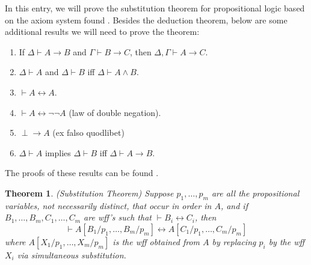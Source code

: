 \documentclass[12pt]{article}
\newtheorem{thm}{Theorem}
\begin{document}
In this entry, we will prove the substitution theorem for propositional logic based on the axiom system found .  Besides the deduction theorem, below are some additional results we will need to prove the theorem:
\begin{enumerate}
\item If $\Delta \vdash A\to B$ and $\Gamma \vdash B\to C$, then $\Delta, \Gamma \vdash A\to C$.
\item $\Delta \vdash A$ and $\Delta \vdash B$ iff $\Delta \vdash A\land B$.
\item $\vdash A\leftrightarrow A$.
\item $\vdash A\leftrightarrow \neg \neg A$ (law of double negation).
\item $\perp \to A$ (ex falso quodlibet)
\item $\Delta \vdash A$ implies $\Delta \vdash B$ iff $\Delta \vdash A\to B$.
\end{enumerate}
The proofs of these results can be found .

\begin{thm} (Substitution Theorem) Suppose $p_1,\ldots,p_m$ are all the propositional variables, not necessarily distinct, that occur in order in $A$, and if $B_1,\ldots,B_m, C_1, \ldots, C_m$ are wff's such that $\vdash B_i \leftrightarrow C_i$, then $$\vdash A[B_1/p_1,\ldots, B_m/p_m] \leftrightarrow A[C_1/p_1,\ldots, C_m/p_m]$$ where $A[X_1/p_1,\ldots,X_m/p_m]$ is the wff obtained from $A$ by replacing $p_i$ by the wff $X_i$ via simultaneous substitution. \end{thm}
\end{document}
